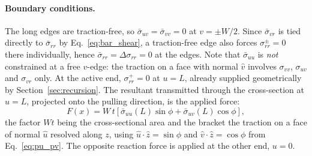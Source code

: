 \documentclass[11pt]{article}
\begin{document}
\paragraph{Boundary conditions.} The long edges are traction-free, so
$\bar\sigma_{uv} = \bar\sigma_{vv} = 0$ at $v = \pm W/2$. Since
$\bar\sigma_{vr}$ is tied directly to $\bar\sigma_{rr}$ by Eq.~\eqref{eq:bar_shear}, a
traction-free edge also forces $\sigma_{rr}^{\pm} = 0$ there individually, hence
$\bar\sigma_{rr} = \Delta\sigma_{rr} = 0$ at the edges. Note that $\bar\sigma_{uu}$ is
\emph{not} constrained at a free $v$-edge: the traction on a face with normal
$\hat v$ involves $\sigma_{vv}$, $\sigma_{uv}$ and $\sigma_{vr}$ only. At the
active end, $\sigma_{rr}^{+} = 0$ at $u = L$, already supplied geometrically by
Section~\ref{sec:recursion}. The resultant transmitted through the cross-section
at $u = L$, projected onto the pulling direction, is the applied force:
\begin{equation}\label{eq:end_load}
    \boxed{\;F(x) = W\,t\left[\bar\sigma_{uu}(L)\sin\phi
      + \bar\sigma_{uv}(L)\cos\phi\right],\;}
\end{equation}
the factor $W t$ being the cross-sectional area and the bracket the traction on a
face of normal $\hat u$ resolved along $z$, using
$\hat u \cdot \hat z = \sin\phi$ and $\hat v \cdot \hat z = \cos\phi$ from
Eq.~\eqref{eq:pu_pv}. The opposite reaction force is applied at the other end, $u = 0$.
\end{document}
